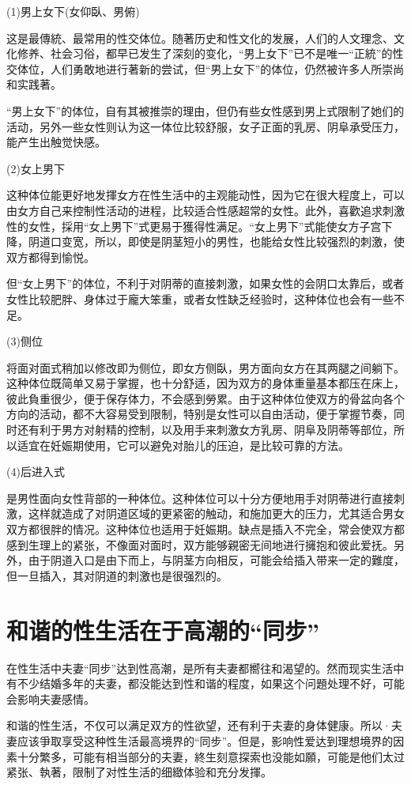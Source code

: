 \documentclass[12pt,UTF8]{ctexbook}
\begin{document}
(1)男上女下(女仰臥、男俯)

这是最傳統、最常用的性交体位。随著历史和性文化的发展，人们的人文理念、文化修养、社会习俗，都早已发生了深刻的变化，“男上女下”已不是唯一“正統”的性交体位，人们勇敢地进行著新的尝试，但“男上女下”的体位，仍然被许多人所崇尚和实践著。

“男上女下”的体位，自有其被推崇的理由，但仍有些女性感到男上式限制了她们的活动，另外一些女性则认为这一体位比较舒服，女子正面的乳房、阴阜承受压力，能产生出触觉快感。

(2)女上男下

这种体位能更好地发揮女方在性生活中的主观能动性，因为它在很大程度上，可以由女方自己来控制性活动的进程，比较适合性感超常的女性。此外，喜歡追求刺激性的女性，採用“女上男下”式更易于獲得性满足。“女上男下”式能使女方子宫下降，阴道口变宽，所以，即使是阴茎短小的男性，也能给女性比较强烈的刺激，使双方都得到愉悦。

但“女上男下”的体位，不利于对阴蒂的直接刺激，如果女性的会阴口太靠后，或者女性比较肥胖、身体过于龐大笨重，或者女性缺乏经验时，这种体位也会有一些不足。

(3)侧位

将面对面式稍加以修改即为侧位，即女方侧臥，男方面向女方在其两腿之间躺下。这种体位既简单又易于掌握，也十分舒适，因为双方的身体重量基本都压在床上，彼此負重很少，便于保存体力，不会感到勞累。由于这种体位使双方的骨盆向各个方向的活动，都不大容易受到限制，特别是女性可以自由活动，便于掌握节奏，同时还有利于男方对射精的控制，以及用手来刺激女方乳房、阴阜及阴蒂等部位，所以适宜在妊娠期使用，它可以避免对胎儿的压迫，是比较可靠的方法。

(4)后进入式

是男性面向女性背部的一种体位。这种体位可以十分方便地用手对阴蒂进行直接刺激，这样就造成了对阴道区域的更紧密的触动，和施加更大的压力，尤其适合男女双方都很胖的情况。这种体位也适用于妊娠期。缺点是插入不完全，常会使双方都感到生理上的紧张，不像面对面时，双方能够親密无间地进行擁抱和彼此爱抚。另外，由于阴道入口是由下而上，与阴茎方向相反，可能会给插入带来一定的難度，但一旦插入，其对阴道的刺激也是很强烈的。

\section{和谐的性生活在于高潮的“同步”}

在性生活中夫妻“同步”达到性高潮，是所有夫妻都嚮往和渴望的。然而现实生活中有不少结婚多年的夫妻，都没能达到性和谐的程度，如果这个问題处理不好，可能会影响夫妻感情。

和谐的性生活，不仅可以满足双方的性欲望，还有利于夫妻的身体健康。所以·夫妻应该爭取享受这种性生活最高境界的“同步”。但是，影响性爱达到理想境界的因素十分繁多，可能有相当部分的夫妻，終生刻意探索也没能如願，可能是他们太过紧张、執著，限制了对性生活的细緻体验和充分发揮。
\end{document}
